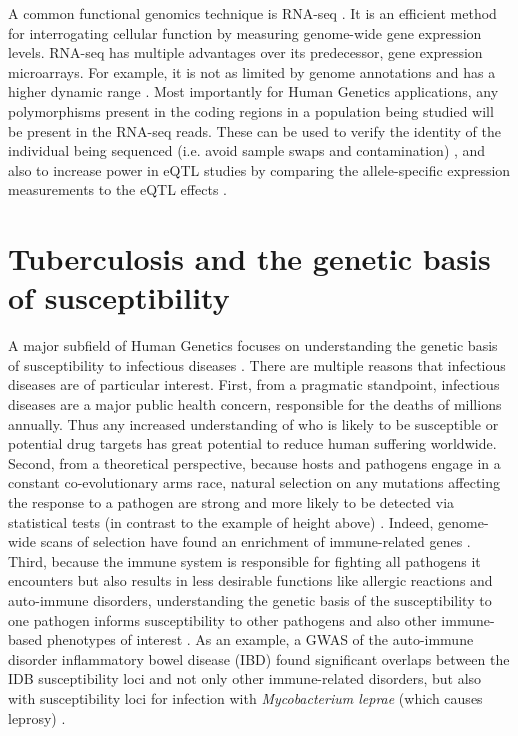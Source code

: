 A common functional genomics technique is RNA-seq \citep{Wang2009, Oshlack2010, Waern2011}. It
is an efficient method for interrogating cellular function by
measuring genome-wide gene expression levels. RNA-seq has multiple
advantages over its predecessor, gene expression microarrays. For
example, it is not as limited by genome annotations and has a higher
dynamic range \citep{Marioni2008, Zhao2014}. Most importantly for Human Genetics applications, any
polymorphisms present in the coding regions in a population being
studied will be present in the RNA-seq reads. These can be used to
verify the identity of the individual being sequenced (i.e. avoid
sample swaps and contamination) \citep{Jun2012}, and also to increase power in eQTL
studies by comparing the allele-specific expression measurements to
the eQTL effects \citep{Castel2015, VandeGeijn2015}.

\section{Tuberculosis and the genetic basis of susceptibility}

A major subfield of Human Genetics focuses on understanding the
genetic basis of susceptibility to infectious diseases \citep{Casanova2007, Chapman2012, Novembre2012, Manry2013}. There are
multiple reasons that infectious diseases are of particular
interest. First, from a pragmatic standpoint, infectious diseases are
a major public health concern, responsible for the deaths of millions
annually. Thus any increased understanding of who is likely to be
susceptible or potential drug targets has great potential to reduce
human suffering worldwide. Second, from a theoretical
perspective, because hosts and pathogens engage in a constant
co-evolutionary arms race, natural selection on any mutations
affecting the response to a pathogen are strong and more likely to be
detected via statistical tests (in contrast to the example of height
above) \citep{Hamblin2002, Prugnolle2005, Novembre2012, Fumagalli2014, Mangano2014}. Indeed, genome-wide scans of selection have found an
enrichment of immune-related genes \citep{Raj2013, Fumagalli2011, Fumagalli2014}. Third,
because the immune system is responsible for fighting all pathogens it
encounters but also results in less desirable functions like allergic
reactions and auto-immune disorders, understanding the genetic basis
of the susceptibility to one pathogen informs susceptibility to other
pathogens and also other immune-based phenotypes of interest \citep{Vannberg2011, Raj2013}. As an
example, a GWAS of the auto-immune disorder inflammatory bowel disease
(IBD) found significant overlaps between the IDB susceptibility loci
and not only other immune-related disorders, but also with
susceptibility loci for infection with \emph{Mycobacterium leprae}
(which causes leprosy) \citep{Jostins2012}.

